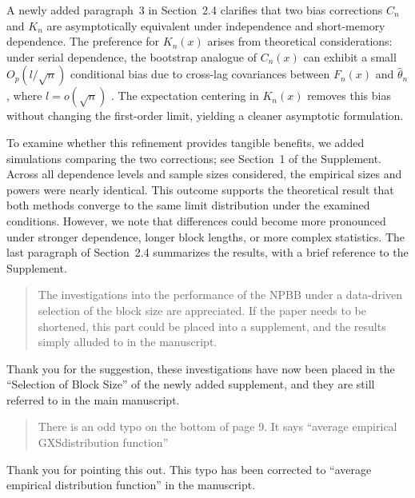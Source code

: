 \documentclass[12pt]{article}
\newenvironment{comment}%
{\begin{quotation}\noindent\small\it\color{darkblue}\ignorespaces%
}{\end{quotation}}
\begin{document}
A newly added paragraph~3 in Section~2.4
clarifies that two bias corrections $C_n$ and
$K_n$ are asymptotically equivalent under independence and
short-memory dependence.  The preference for $K_n(x)$ arises from
theoretical considerations: under serial dependence, the bootstrap
analogue of $C_n(x)$ can exhibit a small $O_p(l/\sqrt{n})$ conditional bias
due to cross-lag covariances between $F_n(x)$ and $\hat\theta_n$,
where $l = o(\sqrt{n})$ \citep{buhlmann1994blockwise,
  lahiri1999theoretical}.  The expectation centering in $K_n(x)$
removes this bias without changing the first-order limit, yielding a
cleaner asymptotic formulation.


To examine whether this refinement provides tangible benefits, we added
simulations comparing the two corrections; see Section~1 of the
Supplement. Across all dependence levels
and sample sizes considered, the empirical sizes and powers were nearly
identical.  This outcome supports the theoretical result that both
methods converge to the same limit distribution under the examined
conditions. However, we note that differences could become more
pronounced under stronger dependence, longer block lengths, or more
complex statistics. The last paragraph of Section~2.4 summarizes the
results, with a brief reference to the Supplement.


\begin{comment}
The investigations into the performance of the NPBB under a
data-driven selection of the block size are appreciated.  If the paper
needs to be shortened, this part could be placed into a supplement,
and the results simply alluded to in the manuscript.
\end{comment}

Thank you for the suggestion, these investigations have now been
placed in the ``Selection of Block Size'' of the newly added
supplement, and they are still referred to in the main manuscript.

\begin{comment}
There is an odd typo on the bottom of page 9. It says ``average
empirical GXSdistribution function''
\end{comment}

Thank you for pointing this out. This typo has been
corrected to ``average empirical distribution function'' in the manuscript.





\end{document}
